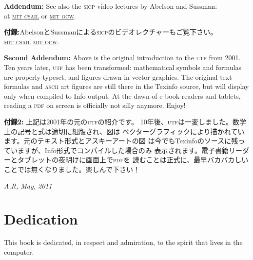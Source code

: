 \documentclass[8pt,oneside]{book}
\newcommand{\acronym}[1]{\textsc{\MakeLowercase{#1}}}
\begin{document}
\vspace{1.0em}
\noindent
\textbf{Addendum:} See also the \acronym{SICP} video lectures by Abelson and Sussman:\\
at \href{http://groups.csail.mit.edu/mac/classes/6.001/abelson-sussman-lectures/}{\acronym{MIT CSAIL}} or 
\href{http://ocw.mit.edu/courses/electrical-engineering-and-computer-science/6-001-structure-and-interpretation-of-computer-programs-spring-2005/video-lectures/}{\acronym{MIT OCW}}.

\textbf{付録:}AbelsonとSussmanによる\acronym{SICP}のビデオレクチャーもご覧下さい。\\
\href{http://groups.csail.mit.edu/mac/classes/6.001/abelson-sussman-lectures/}{\acronym{MIT CSAIL}}
\href{http://ocw.mit.edu/courses/electrical-engineering-and-computer-science/6-001-structure-and-interpretation-of-computer-programs-spring-2005/video-lectures/}{\acronym{MIT OCW}}.


\vspace{0.5em}
\noindent 
\textbf{Second Addendum:} Above is the original introduction to the \acronym{UTF} 
from 2001. Ten years later, \acronym{UTF} has been transformed: mathematical 
symbols and formulas are properly typeset, and figures drawn in 
vector graphics. The original text formulas and \acronym{ASCII} art figures 
are still there in the Texinfo source, but will display only when compiled 
to Info output. At the dawn of e-book readers and tablets, reading a 
\acronym{PDF} on screen is officially not silly anymore. Enjoy!

\noindent
\textbf{付録2:} 上記は2001年の元の\acronym{UTF}の紹介です。
10年後、\acronym{UTF}は一変しました。数学上の記号と式は適切に組版され、図は
ベクターグラフィックにより描かれています。元のテキスト形式とアスキーアートの図
は今でもTexinfoのソースに残っていますが、Info形式でコンパイルした場合のみ
表示されます。電子書籍リーダーとタブレットの夜明けに画面上で\acronym{PDF}を
読むことは正式に、最早バカバカしいことでは無くなりました。楽しんで下さい！

\vspace{0.5em}
\noindent
\textit{A.R, May, 2011}

\label{Dedication}
\chapter*{Dedication}

This book is dedicated, in respect and admiration, to the spirit that lives in
the computer.
\end{document}
